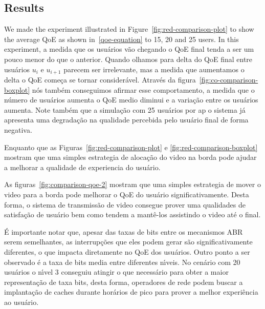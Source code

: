 

\subsection{Results}

We made the experiment illustrated in Figure~\ref{fig:red-comparison-plot} to show the average QoE as shown in~\ref{qoe-equation} to 15, 20 and 25 users. In this experiment, a medida que os usuários vão chegando o QoE final tenda a ser um pouco menor do que o anterior. Quando olhamos para delta do QoE final entre usuários $u_{i}$ e $u_{i+1}$ parecem ser irrelevante, mas a medida que aumentamos o delta o QoE começa se tornar considerável. Através da figura~\ref{fig:co-comparison-boxplot} nós também conseguimos afirmar esse comportamento, a medida que o número de usuários aumenta o QoE medio diminui e a variação entre os usuários aumenta. Note também que a simulação com 25 usuários por ap o sistema já apresenta uma degradação na qualidade percebida pelo usuário final de forma negativa.

Enquanto que as Figuras~\ref{fig:red-comparison-plot} e \ref{fig:red-comparison-boxplot} mostram que uma simples estrategia de alocação do video na borda pode ajudar a melhorar a qualidade de experiencia do usuário.

As figuras~\ref{fig:comparison-qoe-2} mostram que uma simples estrategia de mover o video para a borda pode melhorar o QoE do usuário significativamente. Desta forma, o sistema de transmissão de video consegue  prover uma qualidades de satisfação de usuário bem como tendem a mantê-los assistindo o video até o final.

É importante notar que, apesar das taxas de bits entre os mecanismos ABR serem semelhantes, as interrupções que eles podem gerar são significativamente diferentes, o que impacta diretamente no QoE dos usuários. Outro ponto a ser observado é a taxa de bits media entre diferentes nı́veis. No cenário com 20 usuários o nı́vel 3 conseguiu atingir o que necessário para obter a maior representação de taxa bits, desta forma, operadores de rede podem buscar a implantação de caches durante horários de pico para prover a melhor experiência ao usuário.